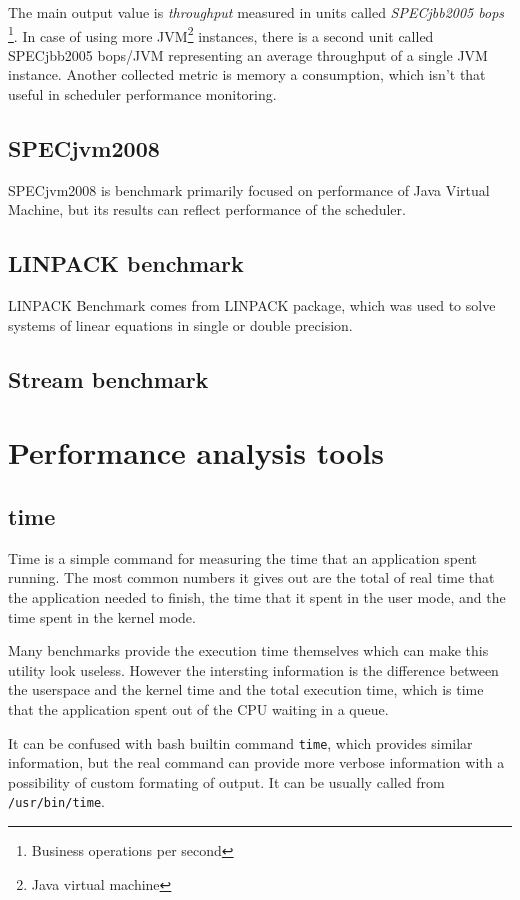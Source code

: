 The main output value is \emph{throughput} measured in units called
\emph{SPECjbb2005 bops} \footnote{Business operations per second}. In case of
using more JVM\footnote{Java virtual machine} instances, there is a second unit
called SPECjbb2005 bops/JVM representing an average throughput of a single JVM
instance. Another collected metric is memory a consumption, which isn't that
useful in scheduler performance monitoring.

\subsection{SPECjvm2008}
SPECjvm2008 is benchmark primarily focused on performance of Java Virtual
Machine, but its results can reflect performance of the scheduler.

\subsection{LINPACK benchmark}
LINPACK Benchmark comes from LINPACK package, which was used to solve systems of linear equations in single or double precision.

\subsection{Stream benchmark}

\section{Performance analysis tools}

\subsection{time}
Time is a simple command for measuring the time that an application spent running. The
most common numbers it gives out are the total of real time that the application needed
to finish, the time that it spent in the user mode, and the time spent in the kernel mode.

Many benchmarks provide the execution time themselves which can make this
utility look useless. However the intersting information is the difference between
the userspace and the kernel time and the total execution time, which is time that
the application spent out of the CPU waiting in a queue.

It can be confused with bash builtin command \texttt{time}, which provides similar
information, but the real command can provide more verbose information with
a possibility of custom formating of output. It can be usually called from
\texttt{/usr/bin/time}.

